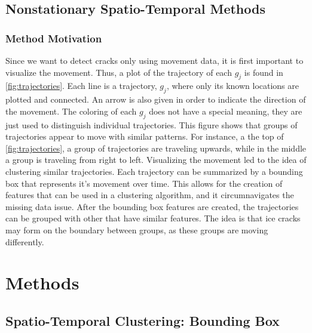 \documentclass[12pt]{article}
\begin{document}
\hypertarget{nonstationary-spatio-temporal-methods}{%
\subsection{Nonstationary Spatio-Temporal
Methods}\label{nonstationary-spatio-temporal-methods}}

\hypertarget{method-motivation}{%
\subsubsection{Method Motivation}\label{method-motivation}}

Since we want to detect cracks only using movement data, it is first
important to visualize the movement. Thus, a plot of the trajectory of
each \(g_j\) is found in \cref{fig:trajectories}. Each line is a
trajectory, \(g_j\), where only its known locations are plotted and
connected. An arrow is also given in order to indicate the direction of
the movement. The coloring of each \(g_j\) does not have a special
meaning, they are just used to distinguish individual trajectories. This
figure shows that groups of trajectories appear to move with similar
patterns. For instance, a the top of \cref{fig:trajectories}, a group of
trajectories are traveling upwards, while in the middle a group is
traveling from right to left. Visualizing the movement led to the idea
of clustering similar trajectories. Each trajectory can be summarized by
a bounding box that represents it's movement over time. This allows for
the creation of features that can be used in a clustering algorithm, and
it circumnavigates the missing data issue. After the bounding box
features are created, the trajectories can be grouped with other that
have similar features. The idea is that ice cracks may form on the
boundary between groups, as these groups are moving differently.

\hypertarget{methods}{%
\section{Methods}\label{methods}}

\hypertarget{spatio-temporal-clustering-bounding-box}{%
\subsection{Spatio-Temporal Clustering: Bounding
Box}\label{spatio-temporal-clustering-bounding-box}}
\end{document}
